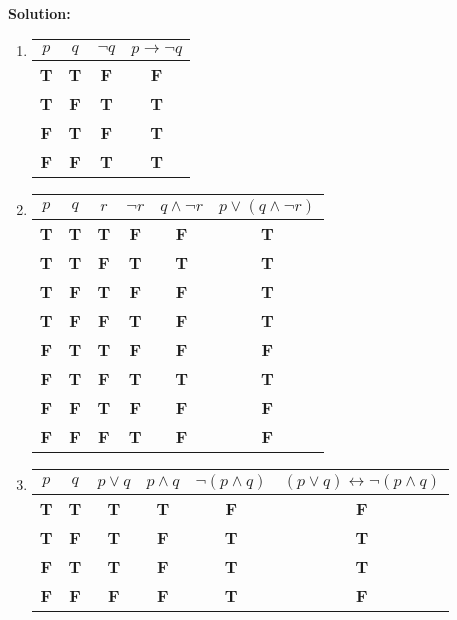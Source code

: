\documentclass{article}
\newenvironment{solution}
{
\par
\color{blue}
\vspace{2mm}
\hline \\
\textbf{Solution:}
}
{
\vspace{2mm}
\newpage
}
\newcommand{\T}{\color{black} \textbf{T}}
\newcommand{\F}{\color{red} \textbf{F}}
\begin{document}
\begin{enumerate}
    \begin{solution}
    \begin{enumerate}
        \item \begin{tabular}{c|c|c|c}
            $p$ & $q$ & $\neg q$ & $p \rightarrow \neg q$\\
            \hline
            \T & \T & \F & \F \\
            \T & \F & \T & \T \\
            \F & \T & \F & \T\\
            \F & \F & \T & \T\\
        \end{tabular}
        \item \begin{tabular}{c|c|c|c|c|c}
            $p$ & $q$ & $r$ & $\neg r$ & $q \land \neg r$ & $p \lor (q \land \neg r)$\\
            \hline
            \T & \T & \T & \F & \F & \T\\
            \T & \T & \F & \T & \T & \T\\
            \T & \F & \T & \F & \F & \T\\
            \T & \F & \F & \T & \F & \T\\
            \F & \T & \T & \F & \F & \F\\
            \F & \T & \F & \T & \T & \T\\
            \F & \F & \T & \F & \F & \F\\
            \F & \F & \F & \T & \F & \F\\
        \end{tabular}
        \item \begin{tabular}{c|c|c|c|c|c}
            $p$ & $q$ & $p \lor q$ & $p \land q$ &$\neg (p \land q)$ &$(p \lor q) \leftrightarrow \lnot (p \land q)$\\
            \hline
            \T & \T & \T & \T & \F & \F\\
            \T & \F & \T & \F & \T & \T\\
            \F & \T & \T & \F & \T & \T\\
            \F & \F & \F & \F & \T & \F\\
        \end{tabular}
    \end{enumerate}

    
    \end{solution}
    

\end{enumerate}
\end{document}
